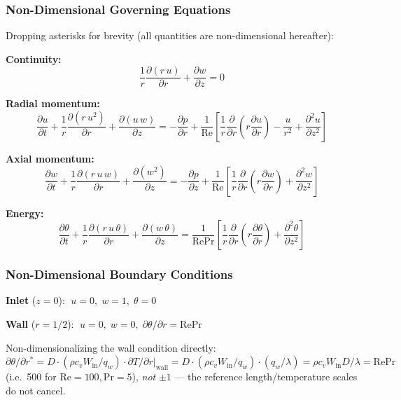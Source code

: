 \documentclass[12pt,a4paper]{article}
\newcommand{\parder}[2]{\frac{\partial #1}{\partial #2}}
\newcommand{\pparder}[2]{\frac{\partial^2 #1}{\partial {#2}^2}}
\newcommand{\Rey}{\text{Re}}
\newcommand{\Pran}{\text{Pr}}
\begin{document}
\subsubsection{Non-Dimensional Governing Equations}

Dropping asterisks for brevity (all quantities are non-dimensional hereafter):

\textbf{Continuity:}
\begin{equation}
    \frac{1}{r}\parder{(r\,u)}{r} + \parder{w}{z} = 0
    \label{eq:continuity_nd}
\end{equation}

\textbf{Radial momentum:}
\begin{equation}
    \parder{u}{t} + \frac{1}{r}\parder{(r\,u^2)}{r} + \parder{(u\,w)}{z}
    = -\parder{p}{r}
      + \frac{1}{\Rey}\left[\frac{1}{r}\parder{}{r}\!\left(r\parder{u}{r}\right) - \frac{u}{r^2} + \pparder{u}{z}\right]
    \label{eq:momentum_r_nd}
\end{equation}

\textbf{Axial momentum:}
\begin{equation}
    \parder{w}{t} + \frac{1}{r}\parder{(r\,u\,w)}{r} + \parder{(w^2)}{z}
    = -\parder{p}{z}
      + \frac{1}{\Rey}\left[\frac{1}{r}\parder{}{r}\!\left(r\parder{w}{r}\right) + \pparder{w}{z}\right]
    \label{eq:momentum_z_nd}
\end{equation}

\textbf{Energy:}
\begin{equation}
    \parder{\theta}{t} + \frac{1}{r}\parder{(r\,u\,\theta)}{r} + \parder{(w\,\theta)}{z}
    = \frac{1}{\Rey\Pran}\left[\frac{1}{r}\parder{}{r}\!\left(r\parder{\theta}{r}\right) + \pparder{\theta}{z}\right]
    \label{eq:energy_nd}
\end{equation}

\subsubsection{Non-Dimensional Boundary Conditions}

\textbf{Inlet} ($z = 0$):
$\;u = 0,\; w = 1,\; \theta = 0$

\textbf{Wall} ($r = 1/2$):
$\;u = 0,\; w = 0,\; \partial\theta/\partial r = \Rey\Pran$

Non-dimensionalizing the wall condition directly: $\partial\theta/\partial r^* = D\cdot(\rho c_v W_{\text{in}}/q_w)\cdot\partial T/\partial r|_{\text{wall}} = D\cdot(\rho c_v W_{\text{in}}/q_w)\cdot(q_w/\lambda) = \rho c_v W_{\text{in}} D/\lambda = \Rey\Pran$ (i.e.\ 500 for $\Rey=100,\Pran=5$), \emph{not} $\pm 1$ — the reference length/temperature scales do not cancel.
\end{document}
